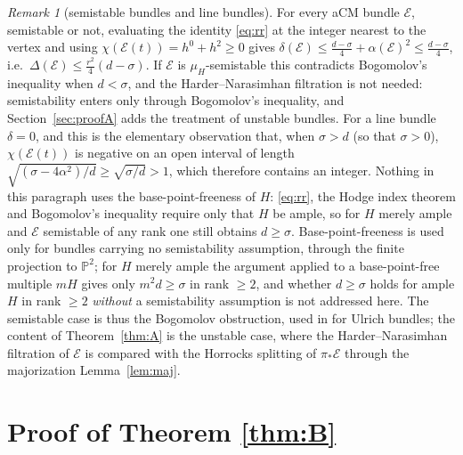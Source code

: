 \documentclass[11pt]{amsart}
\theoremstyle{remark}
\newtheorem{remark}[theorem]{Remark}
\theoremstyle{definition}
\newcommand{\PP}{\mathbb{P}}
\newcommand{\cE}{\mathcal{E}}
\begin{document}
\begin{remark}[semistable bundles and line bundles]\label{rem:rr}
For every aCM bundle $\cE$, semistable or not, evaluating the identity \eqref{eq:rr} at the integer nearest to the vertex and using $\chi(\cE(t))=h^0+h^2\ge0$ gives $\delta(\cE)\le\tfrac{d-\sigma}4+\alpha(\cE)^2\le\tfrac{d-\sigma}4$, i.e.\ $\Delta(\cE)\le\tfrac{r^2}{4}(d-\sigma)$. If $\cE$ is $\mu_H$-semistable this contradicts Bogomolov's inequality when $d<\sigma$, and the Harder--Narasimhan filtration is not needed: semistability enters only through Bogomolov's inequality, and Section~\ref{sec:proofA} adds the treatment of unstable bundles. For a line bundle $\delta=0$, and this is the elementary observation that, when $\sigma>d$ (so that $\sigma>0$), $\chi(\cE(t))$ is negative on an open interval of length $\sqrt{(\sigma-4\alpha^2)/d}\ge\sqrt{\sigma/d}>1$, which therefore contains an integer. Nothing in this paragraph uses the base-point-freeness of $H$: \eqref{eq:rr}, the Hodge index theorem and Bogomolov's inequality require only that $H$ be ample, so for $H$ merely ample and $\cE$ semistable of any rank one still obtains $d\ge\sigma$. Base-point-freeness is used only for bundles carrying no semistability assumption, through the finite projection to $\PP^2$; for $H$ merely ample the argument applied to a base-point-free multiple $mH$ gives only $m^2d\ge\sigma$ in rank $\ge2$, and whether $d\ge\sigma$ holds for ample $H$ in rank $\ge2$ \emph{without} a semistability assumption is not addressed here. The semistable case is thus the Bogomolov obstruction, used in \cite{An} for Ulrich bundles; the content of Theorem~\ref{thm:A} is the unstable case, where the Harder--Narasimhan filtration of $\cE$ is compared with the Horrocks splitting of $\pi_*\cE$ through the majorization Lemma~\ref{lem:maj}.
\end{remark}

\section{Proof of Theorem \ref{thm:B}}\label{sec:proofB}
\end{document}
